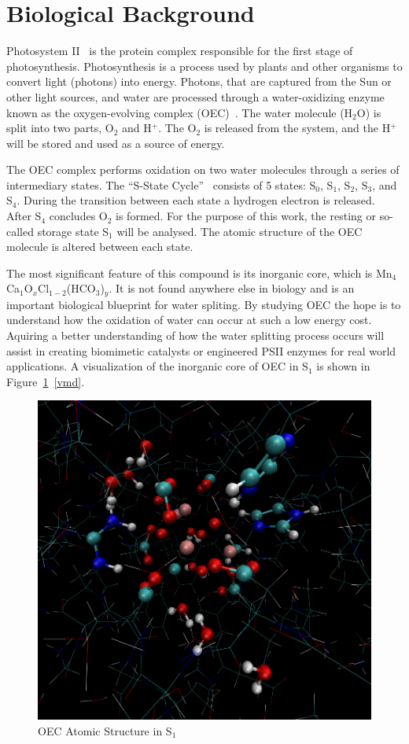 \section{Biological Background}

Photosystem II~\cite{oxygenicPhotosynthesis} is the protein complex responsible for the first stage of photosynthesis. Photosynthesis is a process used by plants and other organisms to convert light (photons) into energy. Photons, that are captured from the Sun or other light sources, and water are processed through a water-oxidizing enzyme known as the oxygen-evolving complex (OEC)~\cite{yano2006manganese}. The water molecule (H$_{2}$O) is split into two parts, O$_{2}$ and H$^{+}$. The O$_{2}$ is released from the system, and the H$^{+}$ will be stored and used as a source of energy.

The OEC complex performs oxidation on two water molecules through a series of intermediary states. The ``S-State Cycle''~\cite{yano2006manganese} consists of 5 states: S$_{0}$, S$_{1}$, S$_{2}$, S$_{3}$, and S$_{4}$. During the transition between each state a hydrogen electron is released. After S$_{4}$ concludes O$_{2}$ is formed. For the purpose of this work, the resting or so-called storage state S$_{1}$ will be analysed. The atomic structure of the OEC molecule is altered between each state.

The most significant feature of this compound is its inorganic core, which is \linebreak Mn$_{4}$Ca$_{1}$O$_{x}$Cl$_{1-2}$(HCO$_{3}$)$_{y}$. It is not found anywhere else in biology and is an important biological blueprint for water spliting. By studying OEC the hope is to understand how the oxidation of water can occur at such a low energy cost. Aquiring a better understanding of how the water splitting process occurs will assist in creating biomimetic catalysts or engineered PSII enzymes for real world applications. A visualization of the inorganic core of OEC in S$_{1}$ is shown in Figure~\ref{fig:oec-in-s1}~\ref{vmd}.

\begin{figure}[H]
	\centering
	\includegraphics[bb=0 0 941 901,scale=0.3]{figures/structure.png}
	\caption{OEC Atomic Structure in S$_{1}$}
	\label{fig:oec-in-s1}
\end{figure}
